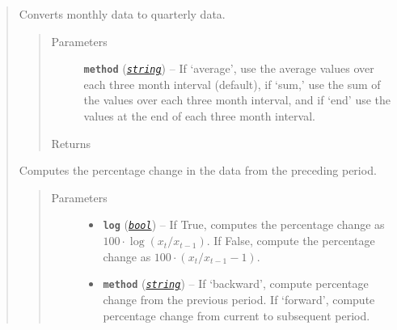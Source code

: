 \documentclass[letterpaper,10pt,english]{sphinxmanual}
\begin{document}
\begin{fulllineitems}
\begin{quote}
\begin{fulllineitems}
\begin{quote}
\begin{description}
\end{description}\end{quote}

\end{fulllineitems}


\begin{fulllineitems}
\label{series_class:fredpy.series.monthtoquarter}
Converts monthly data to quarterly data.
\begin{quote}\begin{description}
\item[{Parameters}] \leavevmode
\textbf{\texttt{method}} (\href{https://docs.python.org/2/library/string.html\#module-string}{\emph{\texttt{string}}}) -- If `average', use the average values over each three month interval (default), if `sum,' use the sum of the values over each three month interval, and if `end' use the values at the end of each three month interval.

\item[{Returns}] \leavevmode
{\hyperref[series_class:fredpy.series]{}}

\end{description}\end{quote}

\end{fulllineitems}


\begin{fulllineitems}
\label{series_class:fredpy.series.pc}
Computes the percentage change in the data from the preceding period.
\begin{quote}\begin{description}
\item[{Parameters}] \leavevmode\begin{itemize}
\item {} 
\textbf{\texttt{log}} (\href{https://docs.python.org/2/library/functions.html\#bool}{\emph{\texttt{bool}}}) -- If True, computes the percentage change as \(100\cdot\log(x_{t}/x_{t-1})\). If False, compute the percentage change as \(100\cdot\left( x_{t}/x_{t-1} - 1\right)\).

\item {} 
\textbf{\texttt{method}} (\href{https://docs.python.org/2/library/string.html\#module-string}{\emph{\texttt{string}}}) -- If `backward', compute percentage change from the previous period. If `forward', compute percentage change from current to subsequent period.


\end{itemize}
\end{description}
\end{quote}
\end{fulllineitems}
\end{quote}
\end{fulllineitems}
\end{document}
